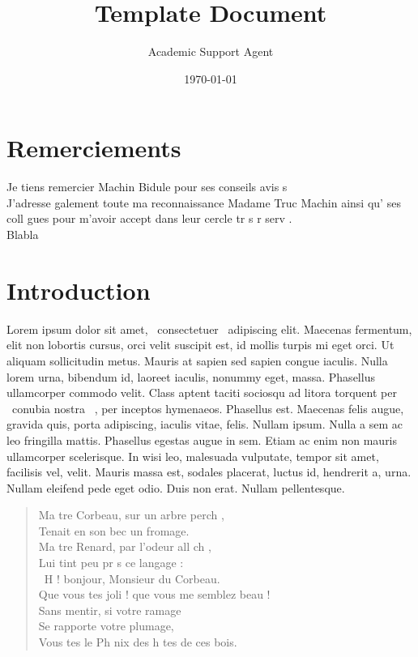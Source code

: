 \documentclass{article}
\title{Template Document}
\author{Academic Support Agent}
\date{\today}
\begin{document}
\maketitle

\maketitle


\clearemptydoublepage
\chapter*{Remerciements}
\thispagestyle{empty}
Je tiens   remercier Machin Bidule pour ses conseils avis s \\
J'adresse  galement toute ma reconnaissance   Madame Truc Machin ainsi qu'  ses coll gues pour m'avoir accept  dans leur cercle tr s r serv . \\
Blabla




\clearemptydoublepage



\clearemptydoublepage
\chapter*{Introduction}

Lorem ipsum dolor sit amet,  ~consectetuer~  adipiscing elit. Maecenas fermentum, elit non lobortis cursus, orci velit suscipit est, id mollis turpis mi eget orci. Ut aliquam sollicitudin metus. Mauris at sapien sed sapien congue iaculis. Nulla lorem urna, bibendum id, laoreet iaculis, nonummy eget, massa. Phasellus ullamcorper commodo velit. Class aptent taciti sociosqu ad litora torquent per  ~conubia nostra~ , per inceptos hymenaeos. Phasellus est. Maecenas felis augue, gravida quis, porta adipiscing, iaculis vitae, felis. Nullam ipsum. Nulla a sem ac leo fringilla mattis. Phasellus egestas augue in sem. Etiam ac enim non mauris ullamcorper scelerisque. In wisi leo, malesuada vulputate, tempor sit amet, facilisis vel, velit. Mauris massa est, sodales placerat, luctus id, hendrerit a, urna. Nullam eleifend pede eget odio. Duis non erat. Nullam pellentesque.

\begin{verse}
Ma tre Corbeau, sur un arbre perch , \\
Tenait en son bec un fromage. \\
Ma tre Renard, par l'odeur all ch , \\
Lui tint   peu pr s ce langage : \\
 ~H  ! bonjour, Monsieur du Corbeau. \\
Que vous  tes joli ! que vous me semblez beau ! \\
Sans mentir, si votre ramage \\
Se rapporte   votre plumage, \\
Vous  tes le Ph nix des h tes de ces bois.~  \\
\end{verse}
\end{document}
